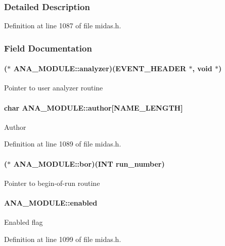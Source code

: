 \subsubsection{Detailed Description}


Definition at line 1087 of file midas.h.

\subsubsection{Field Documentation}
\paragraph[{analyzer}]{($\ast$ {\bf ANA\_\-MODULE::analyzer})({\bf EVENT\_\-HEADER} $\ast$, void $\ast$)}\hfill\label{structANA__MODULE_af3d6511a274c1946ce0bf45e7000e756}
Pointer to user analyzer routine 
\paragraph[{author}]{\setlength{\rightskip}{0pt plus 5cm}char {\bf ANA\_\-MODULE::author}\mbox{[}NAME\_\-LENGTH\mbox{]}}\hfill\label{structANA__MODULE_a870b8ee21be70063bc382c911b5f21d6}
Author 

Definition at line 1089 of file midas.h.
\paragraph[{bor}]{($\ast$ {\bf ANA\_\-MODULE::bor})({\bf INT} {\bf run\_\-number})}\hfill\label{structANA__MODULE_a288a69852e0bcf07f90f4f344c42801b}
Pointer to begin-\/of-\/run routine 
\paragraph[{enabled}]{ {\bf ANA\_\-MODULE::enabled}}\hfill\label{structANA__MODULE_a0d86abcfd4f421658176e51c24f7eb29}
Enabled flag 

Definition at line 1099 of file midas.h.
